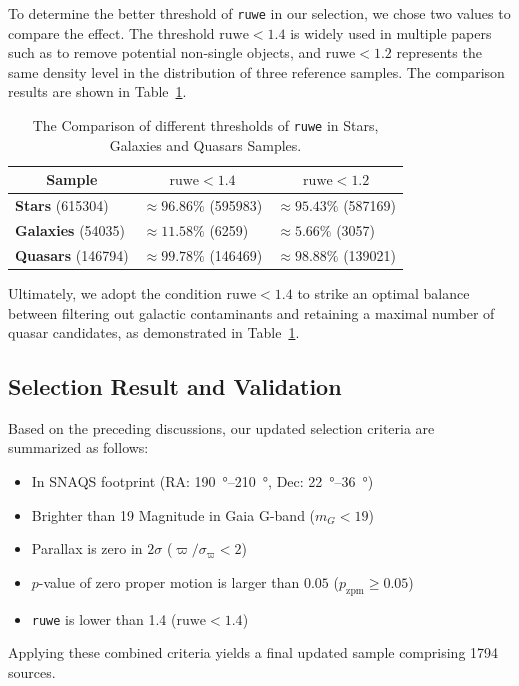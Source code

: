 To determine the better threshold of \texttt{ruwe} in our selection, we chose two values to compare the effect. The threshold $\mathrm{ruwe}<1.4$ is widely used in multiple papers such as \citet{fabriciusGaiaEarlyData2021} to remove potential non-single objects, and $\mathrm{ruwe}<1.2$ represents the same density level in the distribution of three reference samples. The comparison results are shown in Table~\ref{tab:ruwe}.

\begin{table}[htbp]
    \centering
    \begin{tabular}{l l l}
    \toprule
    \multicolumn{1}{c}{Sample} & \multicolumn{1}{c}{$\mathrm{ruwe} < 1.4$} & \multicolumn{1}{c}{$\mathrm{ruwe} < 1.2$} \\
    \midrule
    \textbf{Stars} (\num{615304}) & $\approx 96.86\%$ (\num{595983}) &  $\approx 95.43\%$ (\num{587169}) \\
    \textbf{Galaxies} (\num{54035}) & $\approx 11.58\%$ (\num{6259}) &  $\approx 5.66\%$ (\num{3057}) \\
    \textbf{Quasars} (\num{146794}) & $\approx 99.78\%$ (\num{146469}) &  $\approx 98.88\%$ (\num{139021}) \\
    \bottomrule
    \end{tabular}
    \caption{The Comparison of different thresholds of \texttt{ruwe} in Stars, Galaxies and Quasars Samples.}
    \label{tab:ruwe}
\end{table}

Ultimately, we adopt the condition $\mathrm{ruwe} < 1.4$ to strike an optimal balance between filtering out galactic contaminants and retaining a maximal number of quasar candidates, as demonstrated in Table~\ref{tab:ruwe}.

\subsection{Selection Result and Validation}

Based on the preceding discussions, our updated selection criteria are summarized as follows:
\begin{itemize}
    \item In SNAQS footprint (RA: \qtyrange{190}{210}{\degree}, Dec: \qtyrange{22}{36}{\degree})
    \item Brighter than 19  Magnitude in Gaia G-band ($m_G<19$)
    \item Parallax is zero in $2\sigma$ ($\varpi/\sigma_{\varpi}<2$)
    \item $p$-value of zero proper motion is larger than $0.05$ ($p_{\mathrm{zpm}}\geq0.05$)
    \item \texttt{ruwe} is lower than 1.4 ($\mathrm{ruwe}<1.4$)
\end{itemize}
Applying these combined criteria yields a final updated sample comprising \num{1794} sources. 

